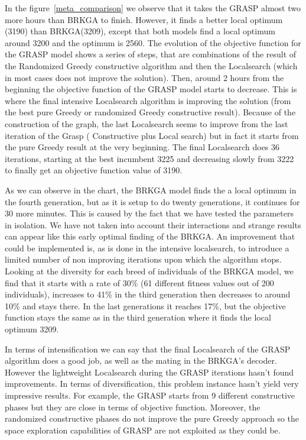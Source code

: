 In the figure~\ref{meta_comparison} we observe that it takes the GRASP almost two more hours than BRKGA to finish. However, it finds a better local optimum (3190) than BRKGA(3209), except that both models find a local optimum around 3200 and the optimum is 2560.
The evolution of the objective function for the GRASP model shows a series of steps, that are combinations of the result of the Randomized Greedy constructive algorithm and then the Localsearch (which in most cases does not improve the solution). Then, around 2 hours from the beginning the objective function of the GRASP model starts to decrease. This is where the final intensive Localsearch algorithm is improving the solution (from the best pure Greedy or randomized Greedy constructive result). Because of the construction of the graph, the last Localsearch seems to improve from the last iteration of the Grasp ( Constructive plus Local search) but in fact it starts from the pure Greedy result at the very beginning. The final Localsearch does 36 iterations, starting at the best incumbent 3225 and decreasing slowly from 3222 to finally get an objective function value of 3190.

As we can observe in the chart, the BRKGA model finds the a local optimum in the fourth generation, but as it is setup to do twenty generations, it continues for 30 more minutes. This is caused by the fact that we have tested the parameters in isolation. We have not taken into account their interactions and strange results can appear like this early optimal finding of the BRKGA. An improvement that could be implemented is, as is done in the intensive localsearch, to introduce a limited number of non improving iterations upon which the algorithm stops. 
Looking at the diversity for each breed of individuals of the BRKGA model, we find that it starts with a rate of 30\% (61 different fitness values out of 200 individuals), increases to 41\% in the third generation then decreases to around 10\% and stays there. In the last generations it reaches 17\%, but the objective function stays the same as in the third generation where it finds the local optimum 3209.

In terms of intensification we can say that the final Localsearch of the GRASP algorithm does a good job, as well as the mating in the BRKGA's decoder. However the lightweight Localsearch during the GRASP iterations hasn't found improvements. 
In terms of diversification, this problem instance hasn't yield very impressive results. For example, the GRASP starts from 9 different constructive phases but they are close in terms of objective function. Moreover, the randomized constructive phases do not improve the pure Greedy approach so the space exploration capabilities of GRASP are not exploited as they could be. 

\pagebreak
